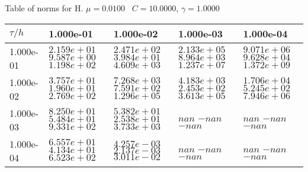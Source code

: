 \begin{center}
Table of norms for H. $\mu = 0.0100$ \, $C = 10.0000$, $\gamma = 1.0000$
  
\begin{tabular}{|p{1in}|p{1in}|p{1in}|p{1in}|p{1in}|} \hline
$\tau / h$ &1.000e-01 &1.000e-02 &1.000e-03 &1.000e-04 \\ \hline 
1.000e-01 & $2.159e+01$  $9.587e+00$  $1.198e+02$  & $2.471e+02$  $3.984e+01$  $4.609e+03$  & $2.133e+05$  $8.964e+03$  $1.237e+07$  & $9.071e+06$  $9.628e+04$  $1.372e+09$  \\ \hline 
1.000e-02 & $3.757e+01$  $1.960e+01$  $2.769e+02$  & $7.268e+03$  $7.591e+02$  $1.296e+05$  & $4.183e+03$  $2.453e+02$  $3.613e+05$  & $1.706e+04$  $5.245e+02$  $7.946e+06$  \\ \hline 
1.000e-03 & $8.250e+01$  $5.484e+01$  $9.331e+02$  & $5.382e+01$  $2.538e+01$  $3.733e+03$  & $nan$  $-nan$  $-nan$  & $nan$  $-nan$  $-nan$  \\ \hline 
1.000e-04 & $6.557e+01$  $4.134e+01$  $6.523e+02$  & $4.257e-03$  $2.137e-03$  $3.011e-02$  & $nan$  $-nan$  $-nan$  & $nan$  $-nan$  $-nan$  \\ \hline 

\end{tabular}\\[20pt]
\end{center}
